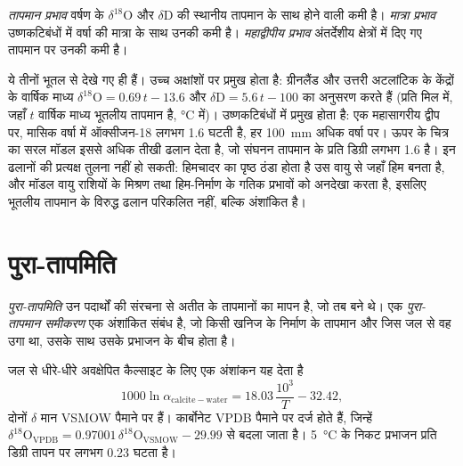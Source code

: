 \begin{definition}[तापमान, मात्रा और महाद्वीपीय प्रभाव]\label{def:b3:stable-isotopes:effects}
\emph{तापमान प्रभाव} वर्षण के
$\delta^{18}\mathrm O$ और $\delta\mathrm D$ की स्थानीय तापमान के साथ होने वाली कमी है।
\emph{मात्रा प्रभाव} उष्णकटिबंधों में वर्षा की मात्रा के साथ
उनकी कमी है। \emph{महाद्वीपीय
प्रभाव} अंतर्देशीय क्षेत्रों में
दिए गए तापमान पर उनकी कमी है।
\end{definition}

ये तीनों भूतल से देखे गए  ही हैं। उच्च अक्षांशों पर
 प्रमुख होता है: ग्रीनलैंड और उत्तरी अटलांटिक के केंद्रों के वार्षिक माध्य
$\delta^{18}\mathrm O = 0.69\,t - 13.6$ और $\delta\mathrm D =
5.6\,t - 100$ का अनुसरण करते हैं (प्रति मिल में, जहाँ $t$ वार्षिक माध्य भूतलीय तापमान है,
\unit{\celsius} में)। उष्णकटिबंधों में  प्रमुख होता है: एक महासागरीय द्वीप पर,
मासिक वर्षा में ऑक्सीजन-18 लगभग \qty{1.6}{\permil} घटती है, हर
\qty{100}{mm} अधिक वर्षा पर। ऊपर के चित्र का सरल मॉडल इससे अधिक तीखी ढलान देता है,
जो संघनन तापमान के प्रति डिग्री लगभग \qty{1.6}{\permil} है। इन ढलानों की प्रत्यक्ष तुलना
नहीं हो सकती: हिमचादर का पृष्ठ ठंडा होता है
उस वायु से जहाँ हिम बनता है, और मॉडल वायु राशियों के मिश्रण
तथा हिम-निर्माण के गतिक प्रभावों को अनदेखा करता है, इसलिए भूतलीय तापमान के विरुद्ध
ढलान परिकलित नहीं, बल्कि अंशांकित है।

\section{पुरा-तापमिति}\label{sec:b3:stable-isotopes:palaeothermometry}

\begin{definition}[पुरा-तापमिति, पुरा-तापमान समीकरण]
\label{def:b3:stable-isotopes:palaeothermometry}
\emph{पुरा-तापमिति} उन पदार्थों की संरचना से अतीत के
तापमानों का मापन है, जो तब बने थे। एक
\emph{पुरा-तापमान समीकरण} एक
अंशांकित संबंध है, जो किसी खनिज के निर्माण के तापमान और
जिस जल से वह उगा था, उसके साथ उसके प्रभाजन के बीच होता है।
\end{definition}

जल से धीरे-धीरे अवक्षेपित कैल्साइट के लिए एक अंशांकन यह देता है
\[
1000\ln\alpha_{\mathrm{calcite-water}} = 18.03\,\frac{10^3}{T} - 32.42,
\]
दोनों $\delta$ मान VSMOW पैमाने पर हैं। कार्बोनेट VPDB पैमाने पर दर्ज होते हैं,
जिन्हें $\delta^{18}\mathrm O_{\mathrm{VPDB}} =
0.97001\,\delta^{18}\mathrm O_{\mathrm{VSMOW}} - 29.99$ से बदला जाता है। \qty{5}{\celsius} के निकट
प्रभाजन प्रति डिग्री तापन पर लगभग \qty{0.23}{\permil} घटता है।

